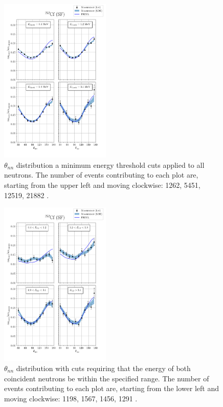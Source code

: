 \documentclass[%
 reprint,
 amsmath,amssymb,
 aps,
 nofootinbib
]{revtex4-1}
\begin{document}
\begin{figure}
\centering
    \includegraphics[width = 0.47\textwidth]{FinalCf252Resultw_freya0KDE.png}
    \caption{
    $\theta_{nn}$ distribution a minimum energy threshold cuts applied to all neutrons.
    The number of events contributing to each plot are, starting from the upper left and moving clockwise: 1262, 5451, 12519, 21882 .}
    \label{fig:Cf(0)}
\end{figure}
\begin{figure}
\centering
    \includegraphics[width = 0.47\textwidth]{FinalCf252Resultw_freya2KDE.png}
    \caption{$\theta_{nn}$ distribution with cuts requiring that the energy of both coincident neutrons be within the specified range.
    The number of events contributing to each plot are, starting from the lower left and moving clockwise: 1198, 1567, 1456, 1291 .}
    \label{fig:Cf(2)}
\end{figure}
\end{document}
